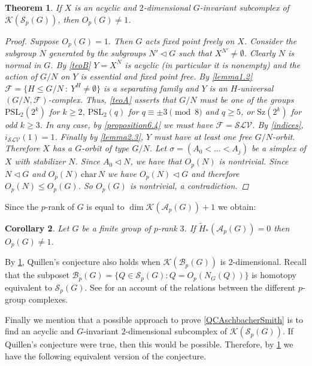 \documentclass[11pt,twoside,reqno]{amsart}
\theoremstyle{plain}
\newtheorem{theorem}{Theorem}[section]
\newtheorem{corollary}[theorem]{Corollary}
\theoremstyle{definition}
\theoremstyle{remark}
\def\wt{\widetilde}
\newcommand{\tq}{\mathrel{{\ensuremath{\: : \: }}}}
\def\A{\mathcal{A}}
\def\B{{\mathcal B}}
\def\F{\mathcal{F}}
\def\K{\mathcal{K}}
\def\S{\mathcal{S}}
\def\SLV{\mathcal{SLV}}
\def\PSL{\mathrm{PSL}}
\def\Sz{\mathrm{Sz}}
\begin{document}
\begin{theorem}\label{genthm}
If $X$ is an acyclic and $2$-dimensional $G$-invariant subcomplex of $\K(\S_p(G))$, then $O_p(G)\neq 1$.

\begin{proof}
Suppose $O_p(G)=1$. Then $G$ acts fixed point freely on $X$.
Consider the subgroup $N$ generated by the subgroups $N'\triangleleft G$ such that $X^{N'}\neq \emptyset$.
Clearly $N$ is normal in $G$.
By \cref{teoB} $Y=X^N$ is acyclic (in particular it is nonempty) and the action of $G/N$ on $Y$ is essential and fixed point free.
By \cref{lemma1.2} $\F=\{ H\leq G/N \tq Y^H\neq \emptyset\}$ is a separating family and $Y$ is an $H$-universal $(G/N,\F)$-complex.
Thus, \cref{teoA} asserts that $G/N$ must be one of the groups $\PSL_2(2^k)$ for $k\geq 2$, $\PSL_2(q)$ for $q\equiv \pm 3 \pmod 8$ and $q\geq 5$, or $\Sz(2^k)$ for odd $k\geq 3$.
In any case, by \cref{proposition6.4} we must have $\F=\SLV$.
By \cref{indices}, $i_\SLV(1)=1$.
Finally by \cref{lemma2.3}, $Y$ must have at least one free $G/N$-orbit.
Therefore $X$ has a $G$-orbit of type $G/N$. Let $\sigma=(A_0<\ldots <A_j)$ be a simplex of $X$ with stabilizer $N$.
Since $A_0\triangleleft N$, we have that $O_p(N)$ is nontrivial.
Since $N\triangleleft G$ and $O_p(N) \, \mathrm{char}\, N$ we have $O_p(N)\triangleleft G$ and therefore $O_p(N)\leq O_p(G)$.
So $O_p(G)$ is nontrivial, a contradiction.
\end{proof}

\end{theorem}


Since the $p$-rank of $G$ is equal to $\dim \K(\A_p(G))+1$ we obtain:

\begin{corollary}\label{prank3}
Let $G$ be a finite group of $p$-rank $3$. If $\wt{H}_*(\A_p(G))=0$ then $O_p(G)\neq 1$.
\end{corollary}


By \cref{genthm}, Quillen's conjecture also holds when $\K(\B_p(G))$ is $2$-dimensional. Recall that the subposet $\B_p(G) = \{Q\in \S_p(G) : Q = O_p(N_G(Q))\}$ is homotopy equivalent to $\S_p(G)$. See \cite{S} for an account of the relations between the different $p$-group complexes.

Finally we mention that a possible approach to prove \cref{QCAschbacherSmith} is to find an acyclic and $G$-invariant $2$-dimensional subcomplex of $\K(\S_p(G))$. If Quillen's conjecture were true, then this would be possible. Therefore, by \cref{genthm} we have the following equivalent version of the conjecture.
\end{document}

